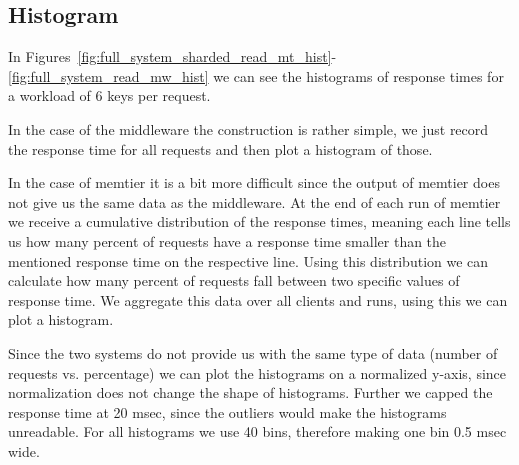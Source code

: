 \documentclass[11pt,a4paper]{article}
\begin{document}
\subsection{Histogram}
%
In Figures~\ref{fig:full_system_sharded_read_mt_hist}-\ref{fig:full_system_read_mw_hist} we can see the histograms of response times for a workload of 6 keys per request.
%
\par
%
In the case of the middleware the construction is rather simple, we just record the response time for all requests and then plot a histogram of those.
%
\par
%
In the case of memtier it is a bit more difficult since the output of memtier does not give us the same data as the middleware.
%
At the end of each run of memtier we receive a cumulative distribution of the response times, meaning each line tells us how many percent of requests have a response time smaller than the mentioned response time on the respective line.
%
Using this distribution we can calculate how many percent of requests fall between two specific values of response time.
%
We aggregate this data over all clients and runs, using this we can plot a histogram.
%
\par
%
Since the two systems do not provide us with the same type of data (number of requests vs. percentage) we can plot the histograms on a normalized y-axis, since normalization does not change the shape of histograms.
%
Further we capped the response time at 20 msec, since the outliers would make the histograms unreadable.
%
For all histograms we use 40 bins, therefore making one bin 0.5 msec wide.
%
\end{document}
